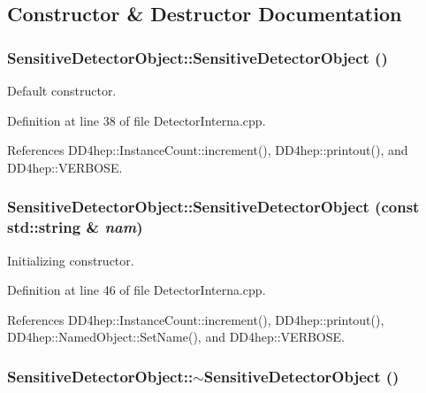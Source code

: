 \subsection{Constructor \& Destructor Documentation}
\hypertarget{class_d_d4hep_1_1_geometry_1_1_sensitive_detector_object_ada6df51a316e3a54c71889a0a7fbd8fd}{
\subsubsection[{SensitiveDetectorObject}]{\setlength{\rightskip}{0pt plus 5cm}SensitiveDetectorObject::SensitiveDetectorObject ()}}
\label{class_d_d4hep_1_1_geometry_1_1_sensitive_detector_object_ada6df51a316e3a54c71889a0a7fbd8fd}


Default constructor. 

Definition at line 38 of file DetectorInterna.cpp.

References DD4hep::InstanceCount::increment(), DD4hep::printout(), and DD4hep::VERBOSE.\hypertarget{class_d_d4hep_1_1_geometry_1_1_sensitive_detector_object_a663926f8216403d414c27ed7c57cc2c3}{
\subsubsection[{SensitiveDetectorObject}]{\setlength{\rightskip}{0pt plus 5cm}SensitiveDetectorObject::SensitiveDetectorObject (const std::string \& {\em nam})}}
\label{class_d_d4hep_1_1_geometry_1_1_sensitive_detector_object_a663926f8216403d414c27ed7c57cc2c3}


Initializing constructor. 

Definition at line 46 of file DetectorInterna.cpp.

References DD4hep::InstanceCount::increment(), DD4hep::printout(), DD4hep::NamedObject::SetName(), and DD4hep::VERBOSE.\hypertarget{class_d_d4hep_1_1_geometry_1_1_sensitive_detector_object_a56ae1536039de98974a535cf6f2e66a1}{
\subsubsection[{$\sim$SensitiveDetectorObject}]{\setlength{\rightskip}{0pt plus 5cm}SensitiveDetectorObject::$\sim$SensitiveDetectorObject ()}}
\label{class_d_d4hep_1_1_geometry_1_1_sensitive_detector_object_a56ae1536039de98974a535cf6f2e66a1}


